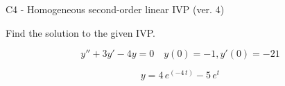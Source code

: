 \begin{exercise}
  \begin{exerciseTitle}C4 - Homogeneous second-order linear IVP (ver. 4)\end{exerciseTitle}
  \begin{exerciseStatement}
    
Find the solution to the given IVP.

    
\[y''+3y'-4y = 0 \hspace{1em} y(0) = -1 , y'(0) = -21\]

  \end{exerciseStatement}
  \begin{exerciseAnswer}
    
\[y= 4 \, e^{\left(-4 \, t\right)} - 5 \, e^{t}\]

  \end{exerciseAnswer}
\end{exercise}